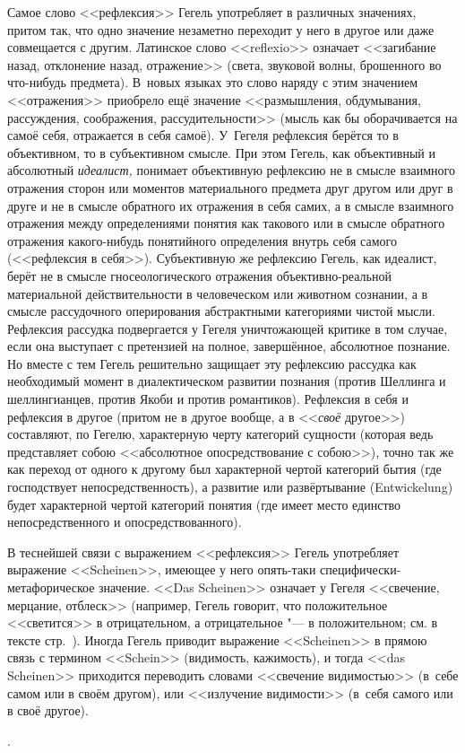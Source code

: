 {Самое слово <<рефлексия>> Гегель употребляет в различных значениях, притом
так, что одно значение незаметно переходит у него в другое или даже
совмещается с другим. Латинское слово <<reflexio>> означает <<загибание назад,
отклонение назад, отражение>> (света, звуковой волны, брошенного во
что-нибудь предмета). В~новых языках это слово наряду с этим значением
<<отражения>> приобрело ещё значение <<размышления, обдумывания, рассуждения,
соображения, рассудительности>> (мысль как бы оборачивается на самоё себя,
отражается в себя самоё). У~Гегеля рефлексия берётся то в объективном, то в
субъективном смысле. При этом Гегель, как объективный и абсолютный
{\em идеалист,} понимает объективную рефлексию не в смысле взаимного
отражения сторон или моментов материального предмета друг другом или друг в
друге и не в смысле обратного их отражения в себя самих, а в смысле
взаимного отражения между определениями понятия как такового или в смысле
обратного отражения какого-нибудь понятийного определения внутрь себя
самого (<<рефлексия в себя>>). Субъективную же рефлексию Гегель, как
идеалист, берёт не в смысле гносеологического отражения объективно-реальной
материальной действительности в человеческом или животном сознании, а в
смысле рассудочного оперирования абстрактными категориями чистой мысли.
Рефлексия рассудка подвергается у Гегеля уничтожающей критике в том случае,
если она выступает с претензией на полное, завершённое, абсолютное
познание. Но вместе с тем Гегель решительно защищает эту рефлексию рассудка
как необходимый момент в диалектическом развитии познания (против Шеллинга
и шеллингианцев, против Якоби и против романтиков). Рефлексия в себя и
рефлексия в другое (притом не в другое вообще, а в <<{\em своё} другое>>)
составляют, по Гегелю, характерную черту категорий сущности (которая ведь
представляет собою <<абсолютное опосредствование с собою>>), точно так же как
переход от одного к другому был характерной чертой категорий бытия (где
господствует непосредственность), а развитие или развёртывание
(Ent\-wicke\-lung) будет характерной чертой категорий понятия (где имеет место
единство непосредственного и опосредствованного).

В теснейшей связи с выражением <<рефлексия>> Гегель употребляет выражение
<<Scheinen>>, имеющее у него опять-таки специфически-метафорическое значение.
<<Das Scheinen>> означает у Гегеля <<свечение, мерцание, отблеск>> (например,
Гегель говорит, что положительное <<светится>> в отрицательном, а
отрицательное "--- в положительном; см. в тексте стр.~\pageref{scheinen}).
Иногда Гегель приводит выражение <<Scheinen>> в прямою связь с термином
<<Schein>> (видимость, кажимость), и тогда <<das Scheinen>> приходится
переводить словами <<свечение видимостью>> (в~себе самом или в своём другом),
или <<излучение видимости>> (в~себя самого или в своё другое).}.
